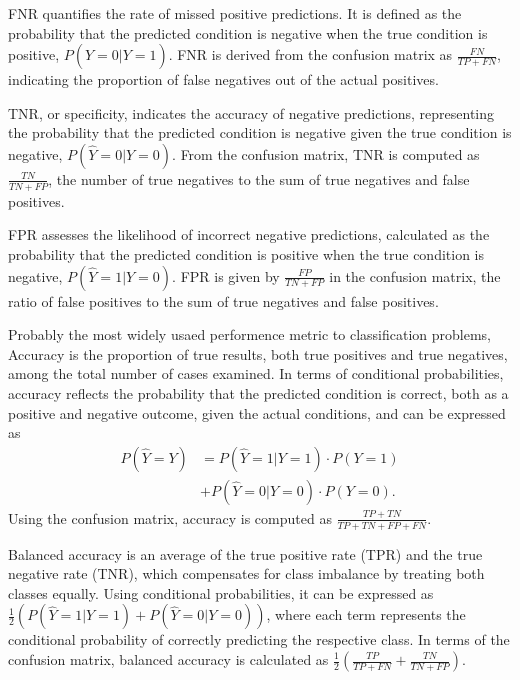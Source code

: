 \begin{definition}\label{def:fnr}
FNR quantifies the rate of missed positive predictions. It is defined as the probability that the predicted condition is negative when the true condition is positive, $P(\hat{Y}=0|Y=1)$. FNR is derived from the confusion matrix as $\frac{FN}{TP + FN}$, indicating the proportion of false negatives out of the actual positives.
\end{definition}

\begin{definition}\label{def:tnr}
TNR, or specificity, indicates the accuracy of negative predictions, representing the probability that the predicted condition is negative given the true condition is negative, $P(\hat{Y}=0|Y=0)$. From the confusion matrix, TNR is computed as $\frac{TN}{TN + FP}$, the number of true negatives to the sum of true negatives and false positives.
\end{definition}

\begin{definition}\label{def:fpr}
FPR assesses the likelihood of incorrect negative predictions, calculated as the probability that the predicted condition is positive when the true condition is negative, $P(\hat{Y}=1|Y=0)$. FPR is given by $\frac{FP}{TN + FP}$ in the confusion matrix, the ratio of false positives to the sum of true negatives and false positives.
\end{definition}

\begin{definition}\label{def:acc}
Probably the most widely usaed performence metric to classification problems, Accuracy is the proportion of true results, both true positives and true negatives, among the total number of cases examined. In terms of conditional probabilities, accuracy reflects the probability that the predicted condition is correct, both as a positive and negative outcome, given the actual conditions, and can be 
expressed as 
\begin{align*}
    P(\hat{Y}=Y) &= P(\hat{Y}=1|Y=1) \cdot P(Y=1) \\
    &+ P(\hat{Y}=0|Y=0) \cdot P(Y=0).
\end{align*}
Using the confusion matrix, accuracy is computed as $\frac{TP + TN}{TP + TN + FP + FN}$. 
\end{definition}
    
\begin{definition}\label{def:ba}
Balanced accuracy is an average of the true positive rate (TPR) and the true negative rate (TNR), which compensates for class imbalance by treating both classes equally. Using conditional probabilities, it can be expressed as $\frac{1}{2}\left(P(\hat{Y}=1|Y=1) + P(\hat{Y}=0|Y=0)\right)$, where each term represents the conditional probability of correctly predicting the respective class. In terms of the confusion matrix, balanced accuracy is calculated as $\frac{1}{2}\left(\frac{TP}{TP + FN} + \frac{TN}{TN + FP}\right)$.
\end{definition}
    
